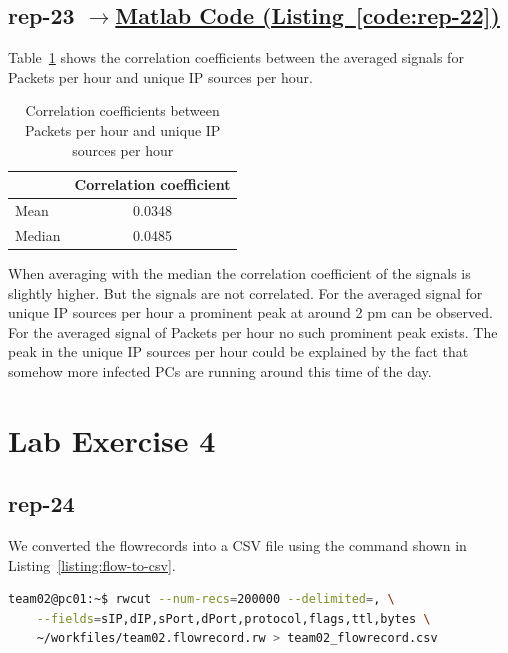 \documentclass{article}
\newcommand{\codelink}[1]{%
    \hyperref[#1]{\quad$\rightarrow$\enskip Matlab Code (Listing~\ref{#1})}%
}
\begin{document}
\subsection{rep-23 \codelink{code:rep-22}} %

Table~\ref{table:rep-23} shows the correlation coefficients between the averaged signals for
Packets per hour and unique IP sources per hour.

\begin{table}[H]
    \centering
    \begin{tabular}{l|c}
        & Correlation coefficient \\
        \hline
        Mean & 0.0348 \\
        Median & 0.0485 \\
    \end{tabular}
    \caption{\label{table:rep-23} Correlation coefficients between Packets per hour and
    unique IP sources per hour}
\end{table}

When averaging with the median the correlation coefficient of the signals is slightly higher.
But the signals are not correlated. For the averaged signal for unique IP sources per hour
a prominent peak at around 2 pm can be observed. For the averaged signal of Packets per hour no
such prominent peak exists.
The peak in the unique IP sources per hour could be explained by the fact that somehow more infected
PCs are running around this time of the day.

\FloatBarrier
\section{Lab Exercise 4}

\subsection{rep-24}

We converted the flowrecords into a CSV file using the command shown in Listing~\ref{listing:flow-to-csv}.

\begin{lstlisting}[label=listing:flow-to-csv,language=bash,caption={Command used to obtain CSV file}]
team02@pc01:~$ rwcut --num-recs=200000 --delimited=, \
    --fields=sIP,dIP,sPort,dPort,protocol,flags,ttl,bytes \
    ~/workfiles/team02.flowrecord.rw > team02_flowrecord.csv
\end{lstlisting}
\end{document}
